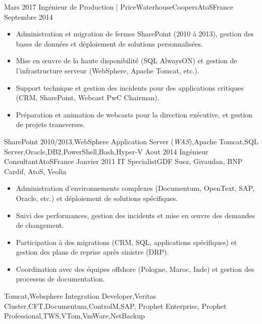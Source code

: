 \begin{experiences}
\emptySeparator
\emptySeparator



  \experience
    {Mars 2017}     {Ingénieur de Production | PriceWaterhouseCoopers}{AtoS}{France}
    {Septembre 2014}    {
                      \begin{itemize}
                        \item Administration et migration de fermes SharePoint (2010 à 2013), gestion des bases de données et déploiement de solutions personnalisées.
                        \item Mise en œuvre de la haute disponibilité (SQL AlwaysON) et gestion de l'infrastructure serveur (WebSphere, Apache Tomcat, etc.).                
                        \item Support technique et gestion des incidents pour des applications critiques (CRM, SharePoint, Webcast PwC Chairman).                   
                        \item Préparation et animation de webcasts pour la direction exécutive, et gestion de projets transverses.                          
                      \end{itemize}
                    }
                    {SharePoint 2010/2013,WebSphere Application Server (\emph{WAS}),Apache Tomcat,SQL Server,Oracle,DB2,PowerShell,Bash,Hyper-V}
  \emptySeparator
  \consultantexperience
  {Aout 2014}       {Ingénieur Consultant}{AtoS}{France}
  {Janvier 2011}   {IT Specialist}{GDF Suez, Givaudan, BNP Cardif, AtoS, Veolia}
                    {
                      \begin{itemize}
                        \item Administration d'environnements complexes (Documentum, OpenText, SAP, Oracle, etc.) et déploiement de solutions spécifiques.
                        \item Suivi des performances, gestion des incidents et mise en œuvre des demandes de changement.
                        \item Participation à des migrations (CRM, SQL, applications spécifiques) et gestion des plans de reprise après sinistre (DRP).
                        \item Coordination avec des équipes offshore (Pologne, Maroc, Inde) et gestion des processus de documentation.
                      \end{itemize}
                    }
                    {Tomcat,Websphere Integration Developer,Veritas Cluster,CFT,Documentum,ControlM,SAP, Prophet Enterprise, Prophet Professional,TWS,VTom,VmWare,NetBackup}

\end{experiences}
